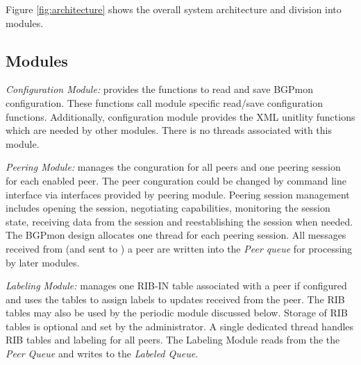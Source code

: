Figure \ref{fig:architecture} shows the overall system architecture and division into modules.

\subsection{Modules}

\emph{Configuration Module:}  provides the functions to read and save BGPmon configuration. These functions call module specific read/save configuration functions. Additionally, configuration module provides the XML unitlity functions which are needed by other modules. There is no threads associated with this module.


\emph{Peering Module:}  
manages the conguration for all peers and one peering session for each enabled peer. 
The peer conguration could be changed by command line interface via interfaces provided by peering module. Peering session management includes opening the session, negotiating capabilities, monitoring the session state, receiving data from the session and reestablishing the session when needed. The BGPmon design allocates one thread for each peering session. All messages received from (and sent to ) a peer are written into the \emph{Peer queue} for processing by later modules.


\emph{Labeling Module:}  manages one RIB-IN table associated with a peer if configured and uses the tables to assign labels to 
updates received from the peer.   The RIB tables may also be used by the periodic module discussed below.  Storage of RIB tables is optional and set by the administrator.   A single dedicated thread handles RIB tables and labeling for all peers.   The Labeling Module reads from the the \emph{Peer Queue} and writes to the \emph{Labeled Queue}.

